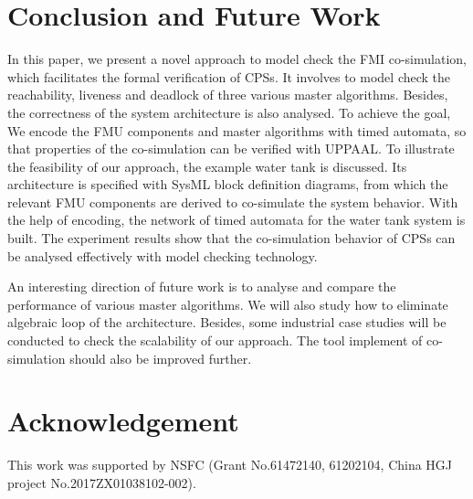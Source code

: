 \section{Conclusion and Future Work}
\label{sec:conclusion&ack}
In this paper, we present a novel approach to model check the FMI co-simulation, which facilitates the formal verification of CPSs. It involves to model check the reachability, liveness and deadlock of three various master algorithms. Besides, the correctness of the system architecture is also analysed. To achieve the goal, We encode the FMU components and master algorithms with timed automata, so that properties of the co-simulation can be verified with UPPAAL. To illustrate the feasibility of our approach, the example water tank is discussed. Its architecture is specified with SysML block definition diagrams, from which the relevant FMU components are derived to co-simulate the system behavior. With the help of encoding, the network of timed automata for the water tank system is built. The experiment results show that the co-simulation behavior of CPSs can be analysed effectively with model checking technology.

An interesting direction of future work is to analyse and compare the performance of various master algorithms. We will also study how to eliminate algebraic loop of the architecture. Besides, some industrial case studies will be conducted to check the scalability of our approach. The tool implement of co-simulation should also be improved further.
\section*{Acknowledgement}
This work was supported by NSFC (Grant No.61472140, 61202104, China HGJ project No.2017ZX01038102-002). 



